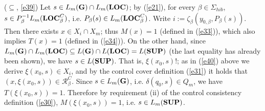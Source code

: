 \documentclass[twocolumn]{autart}
\begin{document}
($\subseteq$, \ref{e39}) Let $s \in L_m({\bf G}) \cap L_m({\bf
LOC})$; by (\ref{e21}), for every $\beta \in \Sigma_{hib}$, $s \in
P_\beta^{-1}L_m({\bf LOC}^C_{\beta})$, i.e. $P_\beta(s) \in L_m({\bf
LOC}^C_{\beta})$. Write $i:= \zeta_\beta(y_{0,\beta},P_\beta(s))$.
Then there exists $x \in X_{i} \cap X_m$; thus $M(x) = 1$ (defined
in (\ref{e33})), which also implies $T(x) = 1$ (defined in
(\ref{e34})). On the other hand, since $L_m({\bf G}) \cap L_m({\bf
LOC}) \subseteq L({\bf G}) \cap L({\bf LOC}) = L({\bf SUP})$ (the
last equality has already been shown), we have $s \in L({\bf SUP})$.
That is, $\xi(x_0,s)!$; as in (\ref{e40}) above we derive
$\xi(x_0,s) \in X_{i}$, and by the control cover definition
(\ref{e31}) it holds that $(x,\xi(x_0,s)) \in \mathcal
{R}^C_{\beta}$. Since $s \in L_m({\bf G})$, i.e. $\delta(q_0,s) \in
Q_m$, we have $T(\xi(x_0, s)) = 1$. Therefore by requirement (ii) of
the control consistency definition (\ref{e30}), $M(\xi(x_0, s)) =
1$, i.e. $s \in L_m({\bf SUP})$.
\end{document}
